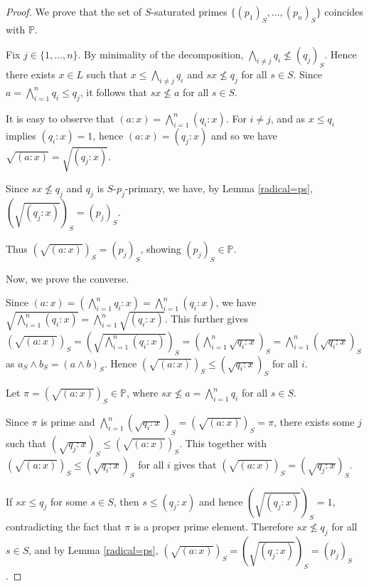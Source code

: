 \documentclass[10pt,twoside,a4]{amsart}
\numberwithin{equation}{section}
\theoremstyle{plain}
\theoremstyle{definition}
\begin{document}
\begin{proof}
	We prove that the set of $S$-saturated primes $\{(p_1)_S,\dots,(p_n)_S\}$ coincides with $\mathbb{P}$.
	
	Fix $j \in \{1,\dots,n\}$. By minimality of the decomposition, $\bigwedge_{i \ne j} q_i \nleq (q_j)_S$. Hence there exists $x \in L$ such that $x \le \bigwedge_{i \ne j} q_i$ and $sx \nleq q_j$ for all $s \in S$. Since $a = \bigwedge_{i=1}^n q_i \le q_j$, it follows that $sx \nleq a$ for all $s \in S$.
	
	It is easy to observe that $(a:x) = \bigwedge_{i=1}^n (q_i:x)$. For $i \ne j$,  and as $x \le q_i$ implies $(q_i:x)=1$, hence $(a:x) = (q_j:x)$ and so we have $\sqrt{(a:x)} = \sqrt{(q_j:x)}$.
	
Since $sx \nleq q_j$ and $q_j$ is $S$-$p_j$-primary, we have, by Lemma \ref{radical=ps}, $(\sqrt{(q_j:x)})_S = (p_j)_S$. 
	
	Thus  $(\sqrt{(a:x)})_S = (p_j)_S$, showing $(p_j)_S \in \mathbb{P}$.
	
	Now, we prove the converse.
	
	Since $(a : x) = \left( \bigwedge_{i=1}^n q_i : x \right) = \bigwedge_{i=1}^n (q_i : x)$, we have $\sqrt{\bigwedge_{i=1}^n (q_i : x)} = \bigwedge_{i=1}^n \sqrt{(q_i : x)}$. This further gives $(\sqrt{(a:x)})_S =\left( \sqrt{\bigwedge_{i=1}^n (q_i : x)} \right)_S = \left( \bigwedge_{i=1}^n \sqrt{q_i : x} \right)_S= \bigwedge_{i=1}^n (\sqrt{q_i : x})_S $   as $a_S \wedge b_S = (a \wedge b)_S$. Hence $(\sqrt{(a:x)})_S \leq (\sqrt{q_i : x})_S$ for all $i$.
	
	Let $\pi = (\sqrt{(a:x)})_S \in \mathbb{P}$, where $sx \nleq a=\bigwedge_{i=1}^n q_i$ for all $s\in S$. 
	
	Since $\pi$ is prime and  $ \bigwedge_{i=1}^n (\sqrt{q_i : x})_S =(\sqrt{(a:x)})_S =\pi$,  there exists  some $j$ such that $(\sqrt{q_j : x})_S \leq (\sqrt{(a:x)})_S  $. This together with $(\sqrt{(a:x)})_S \leq (\sqrt{q_i : x})_S$ for all $i$ gives that $(\sqrt{(a:x)})_S = (\sqrt{q_j: x})_S$. 
	
	 If $sx \le q_j$ for some $s \in S$, then $s \le (q_j:x)$ and hence $(\sqrt{(q_j:x)})_S = 1$, contradicting the fact that $\pi$ is a proper prime element. Therefore $sx \nleq q_j$ for all $s \in S$, and by Lemma \ref{radical=ps}, $(\sqrt{(a:x)})_S =(\sqrt{(q_j:x)})_S = (p_j)_S$.\end{proof}
	 
	 
	
\end{document}
